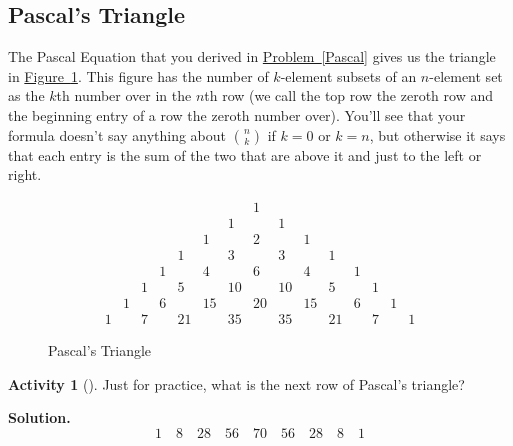 \documentclass[10pt,]{book}
\theoremstyle{plain}
\theoremstyle{definition}
\newtheorem{activity}[project]{Activity}
\numberwithin{equation}{chapter}
\newcommand{\amp}{&}
\begin{document}
\subsection[{Pascal's Triangle}]{Pascal's Triangle}\label{subsection-5}
The Pascal Equation that you derived in \hyperref[Pascal]{Problem~\ref{Pascal}} gives us the triangle in \hyperref[Pascaltriangle]{Figure~\ref{Pascaltriangle}}. This figure has the number of \(k\)-element subsets of an \(n\)-element set as the \(k\)th number over in the \(n\)th row (we call the top row the zeroth row and the beginning entry of a row the zeroth number over). You'll see that your formula doesn't say anything about \(n\choose k\) if \(k=0\) or \(k=n\), but otherwise it says that each entry is the sum of the two that are above it and just to the left or right.%
\begin{figure}
\centering
%
\begin{equation*}
\begin{matrix}\amp \amp \amp \amp \amp \amp \amp 1\amp \amp \amp \amp \amp \amp \amp \\
\amp \amp \amp \amp \amp \amp 1\amp \amp 1\amp \amp \amp \amp \amp \amp \\
\amp \amp \amp \amp \amp 1\amp \amp 2\amp \amp 1\amp \amp \amp \amp \amp \\
\amp \amp \amp \amp 1\amp \amp 3\amp \amp 3\amp \amp 1\amp \amp \amp \amp \\
\amp \amp \amp 1\amp \amp 4\amp \amp 6\amp \amp 4\amp \amp 1\amp \amp \\
\amp \amp 1\amp \amp 5\amp \amp 10\amp \amp 10\amp \amp 5\amp \amp 1\amp \\
\amp 1\amp \amp 6\amp \amp 15\amp \amp 20\amp \amp 15\amp \amp 6\amp \amp 1\\
1\amp \amp 7\amp \amp 21\amp \amp 35\amp \amp 35\amp \amp 21\amp \amp 7\amp \amp 1
\end{matrix}
\end{equation*}
\caption{Pascal's Triangle\label{Pascaltriangle}}
\end{figure}
%
\begin{activity}[]\label{activity-30}
Just for practice, what is the next row of Pascal's triangle?%
\par\medskip\noindent%
\textbf{Solution.}\quad %
\begin{equation*}
1 \quad 8 \quad 28 \quad 56 \quad 70 \quad 56 \quad 28 \quad 8 \quad 1
\end{equation*}
\end{activity}
\end{document}

